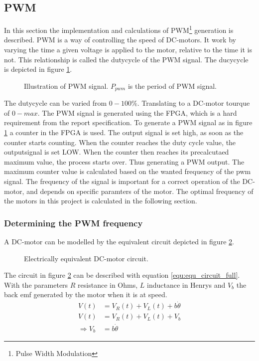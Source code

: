 \documentclass[../../../Main]{subfiles}
\begin{document}
\subsection{PWM}
In this section the implementation and calculations of PWM\footnote{Pulse Width Modulation} generation is described. PWM is a way of controlling the speed of DC-motors. It work by varying the time a given voltage is applied to the motor, relative to the time it is not. This relationship is called the dutycycle of the PWM signal. The ducycycle is depicted in figure \ref{fig:pwm}.

\begin{figure}[h]
  
  \caption{Illustration of PWM signal. $P_{pwm}$ is the period of PWM signal.}
  \label{fig:pwm}
\end{figure}

The dutycycle can be varied from $0 - 100\%$. Translating to a DC-motor tourque of $0 - max$.
The PWM signal is generated using the FPGA, which is a hard requirement from the report specification. To generate a PWM signal as in figure \ref{fig:pwm} a counter in the FPGA  is used.
The output signal is set high, as soon as the counter starts counting. When the counter reaches the duty cycle value, the outputsignal is set LOW. When the counter then reaches its precalcutaed maximum value, the process starts over. Thus generating a PWM output. The maximum counter value is calculated based on the wanted frequency of the pwm signal. The frequency of the signal is important for a correct operation of the DC-motor, and depends on specific paramters of the motor. The optimal frequency of the motors in this project is calculated in the following section.
\newpage
\subsubsection{Determining the PWM frequency}

A DC-motor can be modelled by the equivalent circuit depicted in figure \ref{fig:electrical_equ}.

\begin{figure}[ht]
	\center
	
	\caption{Electrically equivalent DC-motor circuit.}
  \label{fig:electrical_equ}
\end{figure}
The circuit in figure \ref{fig:electrical_equ} can be described with equation \ref{equ:equ_circuit_full}. With the parameters $R$ resistance in Ohms, $L$ inductance in Henrys and $V_b$ the back emf generated by the motor when it is at speed.
\begin{align}
	V(t) &= V_R(t) + V_L(t) + b\dot{\theta}\\
 \label{equ:equ_circuit_full}
	V(t) &= V_R(t) + V_L(t) + V_b\\
	\Rightarrow V_b &= b\dot{\theta}
\end{align}
\end{document}
